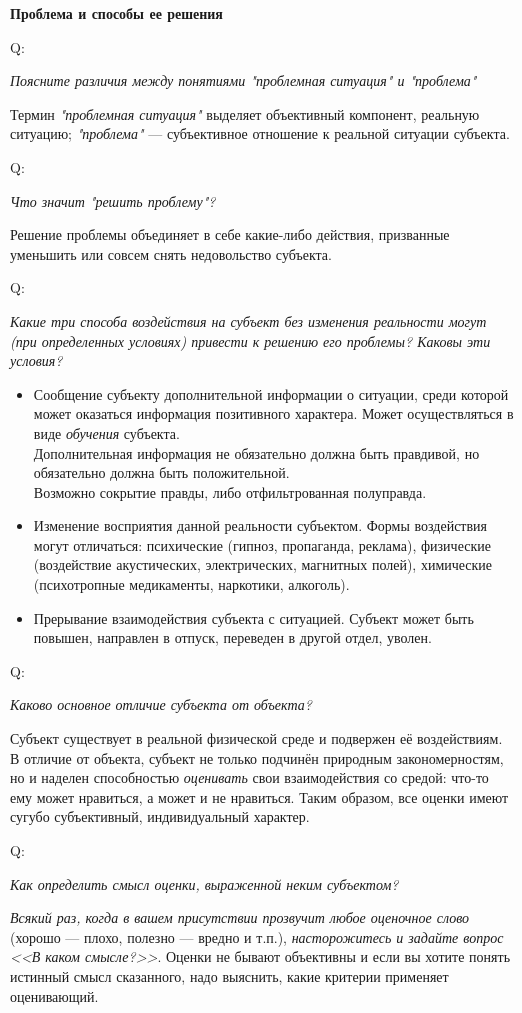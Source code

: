 \documentclass{article}
\newcommand{\note}[1]{\textit{#1}}
\renewcommand{\subsection}[1]{
	\vspace{2em}
	\begin{flushright}
		\large
		\textbf{#1}
	\end{flushright}
	}
\newcommand{\question}[2]{
	\begin{flushright}
		Q:\hspace{2ex}\vline\hspace{2ex}
		\begin{minipage}{0.9\textwidth}
			\large
			\textit{#1}
		\end{minipage}
	\end{flushright}
	\begin{center}
		\begin{minipage}{0.95\textwidth}
			#2
		\end{minipage}
	\end{center}
	}
\begin{document}
\subsection{Проблема и способы ее решения}
\question{Поясните различия между понятиями "проблемная ситуация" и "проблема"}{Термин \note{"проблемная ситуация"} выделяет объективный компонент, реальную ситуацию; \note{"проблема"} --- субъективное отношение к реальной ситуации субъекта.}
\question{Что значит "решить проблему"?}{Решение проблемы объединяет в себе какие-либо действия, призванные уменьшить или совсем снять недовольство субъекта.}
\question{Какие три способа воздействия на субъект без изменения реальности могут (при определенных условиях) привести к решению его проблемы? Каковы эти условия?}{
	\begin{itemize}
		\item Сообщение субъекту дополнительной информации о ситуации, среди которой может оказаться информация позитивного характера. Может осуществляться в виде \note{обучения} субъекта.\\Дополнительная информация не обязательно должна быть правдивой, но обязательно должна быть положительной.\\Возможно сокрытие правды, либо отфильтрованная полуправда.
		\item Изменение восприятия данной реальности субъектом. Формы воздействия могут отличаться: психические (гипноз, пропаганда, реклама), физические (воздействие акустических, электрических, магнитных полей), химические (психотропные медикаменты, наркотики, алкоголь).
		\item Прерывание взаимодействия субъекта с ситуацией. Субъект может быть повышен, направлен в отпуск, переведен в другой отдел, уволен.
	\end{itemize}}
\question{Каково основное отличие субъекта от объекта?}{Субъект существует в реальной физической среде и подвержен её воздействиям. В отличие от объекта, субъект не только подчинён природным закономерностям, но и наделен способностью \note{оценивать} свои взаимодействия со средой: что-то ему может нравиться, а может и не нравиться. Таким образом, все оценки имеют сугубо субъективный, индивидуальный характер.}
\question{Как определить смысл оценки, выраженной неким субъектом?}{\note{Всякий раз, когда в вашем присутствии прозвучит любое оценочное слово} (хорошо --- плохо, полезно --- вредно и т.п.), \note{насторожитесь и задайте вопрос <<В каком смысле?>>}. Оценки не бывают объективны и если вы хотите понять истинный смысл сказанного, надо выяснить, какие критерии применяет оценивающий.}
\end{document}
